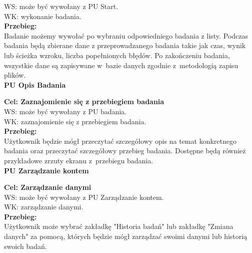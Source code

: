 \documentclass[12pt, letterpaper]{article}
\begin{document}
		WS: może być wywołany z PU Start.\\
		
		WK: wykonanie badania.\\
		
		\textbf{Przebieg: }\\
		Badanie możemy wywołać po wybraniu odpowiedniego badania z listy. Podczas badania będą zbierane dane z przeprowadzanego badania takie jak czas, wynik lub ścieżka wzroku, liczba popełnionych błędów. Po zakończeniu badania, wszystkie dane są zapisywane w~bazie danych zgodnie z~metodologią zapisu plików.
		 \\
		 
		
		\textbf{PU Opis Badania}
		
		\quad
		
		\textbf{Cel: Zaznajomienie się z przebiegiem badania}\\
		
		WS: może być wywołany z PU badania.\\
		
		WK: zaznajomienie się z przebiegiem badania.\\
		
		\textbf{Przebieg: }\\
		Użytkownik będzie mógł przeczytać szczegółowy opis na temat konkretnego badania oraz przeczytać szczegółowy przebieg badania. Dostępne będą również przykładowe zrzuty ekranu z~przebiegu badania.
		 \\
		 
		
		\textbf{PU Zarządzanie kontem}
		
		\quad
		
		\textbf{Cel: Zarządzanie danymi}\\
		
		WS: może być wywołany z PU Zarządzanie kontem.\\
		
		WK: zarządzanie danymi.\\
		
		\textbf{Przebieg:}\\
		Użytkownik może wybrać zakładkę "Historia badań" lub zakładkę "Zmiana danych" za pomocą, których będzie mógł zarządzać swoimi danymi lub historią swoich badań.
		 \\
		 
\end{document}
